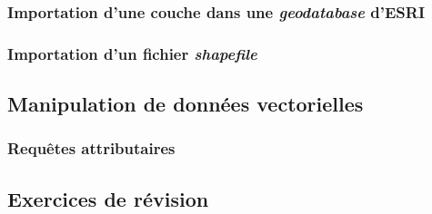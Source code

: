 \documentclass[11pt]{article}
\begin{document}
\hypertarget{importation-dune-couche-dans-une-geodatabase-desri}{%
\subsubsection{\texorpdfstring{Importation d'une couche dans une
\emph{geodatabase}
d'ESRI}{Importation d'une couche dans une geodatabase d'ESRI}}\label{importation-dune-couche-dans-une-geodatabase-desri}}

\hypertarget{importation-dun-fichier-shapefile-1}{%
\subsubsection{\texorpdfstring{Importation d'un fichier
\emph{shapefile}}{Importation d'un fichier shapefile}}\label{importation-dun-fichier-shapefile-1}}

\hypertarget{manipulation-de-donnuxe9es-vectorielles}{%
\subsection{Manipulation de données
vectorielles}\label{manipulation-de-donnuxe9es-vectorielles}}

\hypertarget{requuxeates-attributaires}{%
\subsubsection{Requêtes attributaires}\label{requuxeates-attributaires}}

\hypertarget{exercices-de-ruxe9vision}{%
\subsection{Exercices de révision}\label{exercices-de-ruxe9vision}}


    
    
    
\end{document}
